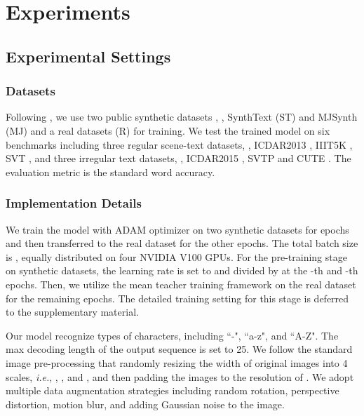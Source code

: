 \documentclass[letterpaper]{article} \usepackage{aaai22}  \usepackage{times}  \usepackage{helvet}  \usepackage{courier}  \usepackage[hyphens]{url}  \usepackage{graphicx} \urlstyle{rm} \def\UrlFont{\rm}  \usepackage{natbib}  \usepackage{caption} \DeclareCaptionStyle{ruled}{labelfont=normalfont,labelsep=colon,strut=off} \frenchspacing  \setlength{\pdfpagewidth}{8.5in}  \setlength{\pdfpageheight}{11in}
\begin{document}
\section{Experiments}
\subsection{Experimental Settings}
\subsubsection{Datasets}
Following \cite{yu2020towards}, we use two public synthetic datasets , , SynthText (ST) \cite{gupta2016synthetic} and MJSynth (MJ) \cite{jaderberg2014synthetic,jaderberg2016reading} and a real datasets (R) \cite{baek2021if} for training. We test the trained model on six benchmarks including three regular scene-text datasets, , ICDAR2013 \cite{karatzas2013icdar}, IIIT5K \cite{mishra2012scene}, SVT \cite{wang2011end}, and three irregular text datasets, , ICDAR2015 \cite{karatzas2015icdar}, SVTP \cite{phan2013recognizing} and CUTE \cite{risnumawan2014robust}. The evaluation metric is the standard word accuracy.



\subsubsection{Implementation Details}
\label{subsec:arch-details}
We train the model with ADAM optimizer on two synthetic datasets for  epochs and then transferred to the real dataset for the other  epochs. The total batch size is , equally distributed on four NVIDIA V100 GPUs. For the pre-training stage on synthetic datasets, the learning rate is set to  and divided by  at the -th and -th epochs. Then, we utilize the mean teacher training framework on the real dataset for the remaining  epochs. The detailed training setting for this stage is deferred to the supplementary material. 



Our model recognize  types of characters, including ``-", ``a-z", and ``A-Z". The max decoding length of the output sequence  is set to 25. We follow the standard image pre-processing that randomly resizing the width of original images into 4 scales, \textit{i.e.}, , ,  and , and then padding the images to the resolution of . We adopt multiple data augmentation strategies including random rotation, perspective distortion, motion blur, and adding Gaussian noise to the image. 
\end{document}
